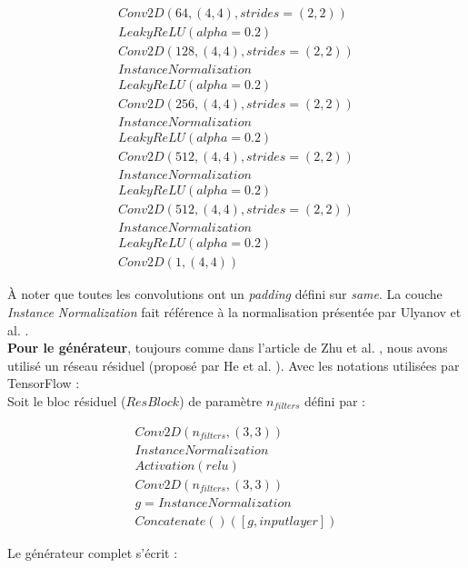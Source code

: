\[ \begin{array}{lcr}
Conv2D(64, (4,4), strides=(2,2)) \\
LeakyReLU(alpha=0.2) \\

Conv2D(128, (4,4), strides=(2,2)) \\
InstanceNormalization\\
LeakyReLU(alpha=0.2)\\

Conv2D(256, (4,4), strides=(2,2)) \\
InstanceNormalization\\
LeakyReLU(alpha=0.2)\\

Conv2D(512, (4,4), strides=(2,2)) \\
InstanceNormalization\\
LeakyReLU(alpha=0.2)\\

Conv2D(512, (4,4), strides=(2,2)) \\
InstanceNormalization\\
LeakyReLU(alpha=0.2)\\

Conv2D(1, (4,4))\end{array}\]

À noter que toutes les convolutions ont un \textit{padding} défini sur \textit{same}. La couche \textit{Instance Normalization} fait référence à la normalisation présentée par Ulyanov et al. \cite{ulyanov_instance_2017}. \\

\textbf{Pour le générateur}, toujours comme dans l'article de Zhu et al. \cite{zhu_unpaired_2018}, nous avons utilisé un réseau résiduel (proposé par He et al. \cite{he_deep_2015}). Avec les notations utilisées par TensorFlow :\\

Soit le bloc résiduel ($ResBlock$) de paramètre $n_{filters}$ défini par :


\[ \begin{array}{lcr}
Conv2D(n_{filters}, (3,3)) \\
InstanceNormalization \\
Activation(relu) \\
Conv2D(n_{filters}, (3,3))\\
g = InstanceNormalization\\
Concatenate()([g, input layer]) \end{array}\]

Le générateur complet s'écrit :

